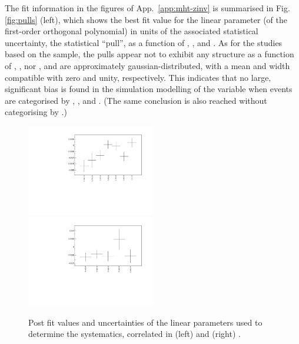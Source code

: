 The fit information in the figures of App.~\ref{app:mht-zinv} is
summarised in Fig.\ref{fig:pulls} (left), which shows the best fit
value for the linear parameter (of the first-order orthogonal
polynomial) in units of the
associated statistical uncertainty, \ie the statistical ``pull'', as a
function of \njet, \nb, and \scalht. As for the studies based on the
\mmj sample, the pulls appear not to exhibit any structure as a
function of \njet, \nb, nor \scalht, and are approximately
gaussian-distributed, with a mean and width compatible with zero and
unity, respectively. This indicates that no large, significant bias is
found in the simulation modelling of the \mht variable when events are
categorised by \njet, \scalht, and \nb. (The same conclusion is also
reached without categorising by \nb.)
\begin{figure}[h!]
  \centering
  \includegraphics[width=0.5\textwidth]{figures/mhtTemplate/exclusive_corr_njet/MuMu_graph}~
  \includegraphics[width=0.5\textwidth]{figures/mhtTemplate/exclusive_corr_ht/MuMu_graph}\\
  \caption{\label{fig:postFitMuMu} Post fit values and uncertainties of
    the linear parameters used to determine the systematics,
    correlated in (left) \njet and (right) \scalht.}
\end{figure}

